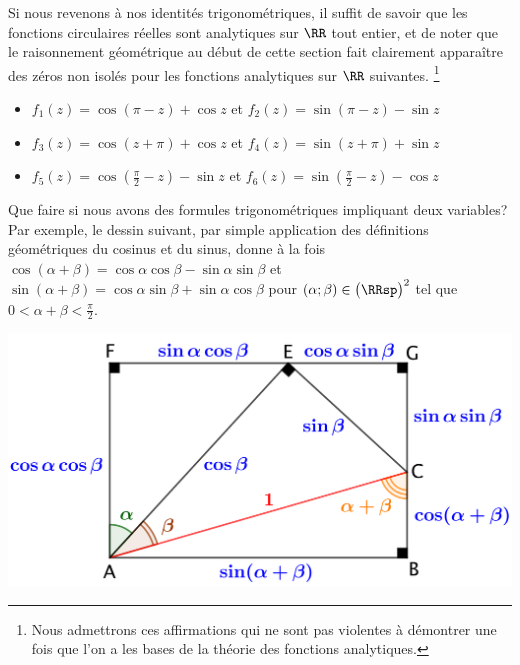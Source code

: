 Si nous revenons à nos identités trigonométriques, il suffit de savoir que les fonctions circulaires réelles sont analytiques sur $\RR$ tout entier, et de noter que le raisonnement géométrique au début de cette section fait clairement apparaître des zéros non isolés pour les fonctions analytiques sur $\RR$ suivantes.%
\footnote{
	Nous admettrons ces affirmations qui ne sont pas violentes à démontrer une fois que l'on a les bases de la théorie des fonctions analytiques.
}
%
\begin{itemize}[label=\small\textbullet]
	\item $f_1(z) = \cos (\pi - z) + \cos z$ 
	   et $f_2(z) = \sin (\pi - z) - \sin z$ 

	\smallskip
	\item $f_3(z) =\cos (z + \pi) + \cos z$ 
	   et $f_4(z) =\sin (z + \pi) + \sin z$

	\smallskip
	\item $f_5(z) =\cos \left( \frac{\pi}{2} - z \right) - \sin z$ 
	   et $f_6(z) =\sin \left( \frac{\pi}{2} - z \right) - \cos z$ 
\end{itemize}








\newpage


Que faire si nous avons des formules trigonométriques impliquant deux variables? Par exemple, le dessin suivant, par simple application des définitions géométriques du cosinus et du sinus, donne à la fois
$\cos(\alpha + \beta) = \cos \alpha \cos \beta - \sin \alpha \sin \beta$
et
$\sin(\alpha + \beta) = \cos \alpha \sin \beta + \sin \alpha \cos \beta$
pour
$(\alpha ; \beta) \in \big( \RRsp \big)^2$ tel que $0 < \alpha + \beta < \frac{\pi}{2}$. 

\begin{center}
	\includegraphics[scale=.7]{two-var-trig-formulas.png}
\end{center}

